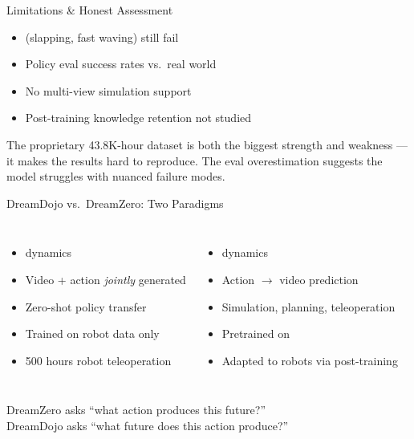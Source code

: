 \begin{frame}{Limitations \& Honest Assessment}
\begin{highlightbox}
\begin{itemize}
    \item {} (slapping, fast waving)
          still fail
    \item Policy eval 
          success rates vs.\ real world
    \item No multi-view simulation support
    \item Post-training knowledge retention not studied
\end{itemize}
\end{highlightbox}

\vspace{0.3em}
\begin{softbox}
 The proprietary 43.8K-hour dataset
is both the biggest strength and weakness ---
it makes the results hard to reproduce.
The eval overestimation suggests the model
struggles with nuanced failure modes.
\end{softbox}
\end{frame}

\begin{frame}{DreamDojo vs.\ DreamZero: Two Paradigms}
\begin{columns}[T]
\begin{itemize}
    \item {} dynamics
    \item Video + action \emph{jointly} generated
    \item Zero-shot policy transfer
    \item Trained on robot data only
    \item 500 hours robot teleoperation
\end{itemize}

\begin{itemize}
    \item {} dynamics
    \item Action $\rightarrow$ video prediction
    \item Simulation, planning, teleoperation
    \item Pretrained on 
    \item Adapted to robots via post-training
\end{itemize}
\end{columns}

\vspace{0.3em}
\begin{keybox}
DreamZero asks ``what action produces this future?''\\
DreamDojo asks ``what future does this action produce?''
\end{keybox}
\end{frame}

